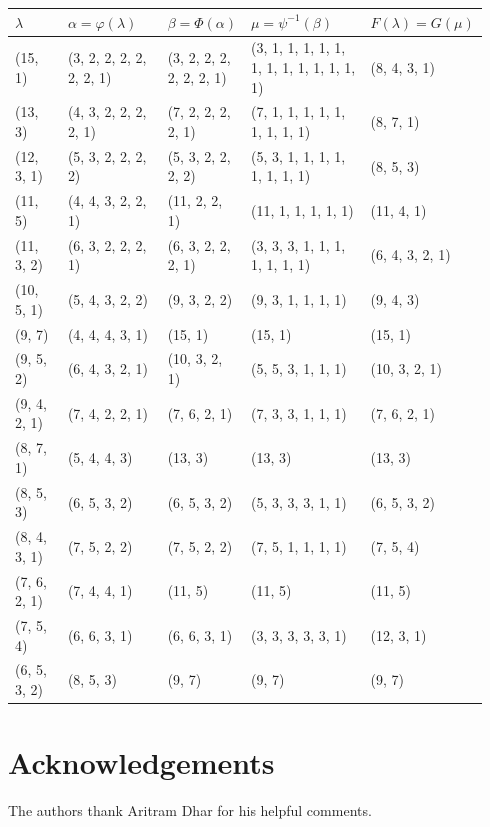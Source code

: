 \documentclass[11pt]{amsart}
\theoremstyle{definition}
\theoremstyle{remark}
\begin{document}
\setlength{\tabcolsep}{2pt}
{\footnotesize
\begin{longtable}{@{}>{\raggedright\arraybackslash}p{0.13\linewidth}>{\raggedright\arraybackslash}p{0.23\linewidth}>{\raggedright\arraybackslash}p{0.17\linewidth}>{\raggedright\arraybackslash}p{0.28\linewidth}>{\raggedright\arraybackslash}p{0.13\linewidth}@{}}
\toprule
\(\lambda\) & \(\alpha=\varphi(\lambda)\) & \(\beta=\Phi(\alpha)\) & \(\mu=\psi^{-1}(\beta)\) & \(F(\lambda)=G(\mu)\) \\
\midrule
\endhead
(15, 1) & (3, 2, 2, 2, 2, 2, 2, 1) & (3, 2, 2, 2, 2, 2, 2, 1) & (3, 1, 1, 1, 1, 1, 1, 1, 1, 1, 1, 1, 1, 1) & (8, 4, 3, 1) \\
(13, 3) & (4, 3, 2, 2, 2, 2, 1) & (7, 2, 2, 2, 2, 1) & (7, 1, 1, 1, 1, 1, 1, 1, 1, 1) & (8, 7, 1) \\
(12, 3, 1) & (5, 3, 2, 2, 2, 2) & (5, 3, 2, 2, 2, 2) & (5, 3, 1, 1, 1, 1, 1, 1, 1, 1) & (8, 5, 3) \\
(11, 5) & (4, 4, 3, 2, 2, 1) & (11, 2, 2, 1) & (11, 1, 1, 1, 1, 1) & (11, 4, 1) \\
(11, 3, 2) & (6, 3, 2, 2, 2, 1) & (6, 3, 2, 2, 2, 1) & (3, 3, 3, 1, 1, 1, 1, 1, 1, 1) & (6, 4, 3, 2, 1) \\
(10, 5, 1) & (5, 4, 3, 2, 2) & (9, 3, 2, 2) & (9, 3, 1, 1, 1, 1) & (9, 4, 3) \\
(9, 7) & (4, 4, 4, 3, 1) & (15, 1) & (15, 1) & (15, 1) \\
(9, 5, 2) & (6, 4, 3, 2, 1) & (10, 3, 2, 1) & (5, 5, 3, 1, 1, 1) & (10, 3, 2, 1) \\
(9, 4, 2, 1) & (7, 4, 2, 2, 1) & (7, 6, 2, 1) & (7, 3, 3, 1, 1, 1) & (7, 6, 2, 1) \\
(8, 7, 1) & (5, 4, 4, 3) & (13, 3) & (13, 3) & (13, 3) \\
(8, 5, 3) & (6, 5, 3, 2) & (6, 5, 3, 2) & (5, 3, 3, 3, 1, 1) & (6, 5, 3, 2) \\
(8, 4, 3, 1) & (7, 5, 2, 2) & (7, 5, 2, 2) & (7, 5, 1, 1, 1, 1) & (7, 5, 4) \\
(7, 6, 2, 1) & (7, 4, 4, 1) & (11, 5) & (11, 5) & (11, 5) \\
(7, 5, 4) & (6, 6, 3, 1) & (6, 6, 3, 1) & (3, 3, 3, 3, 3, 1) & (12, 3, 1) \\
(6, 5, 3, 2) & (8, 5, 3) & (9, 7) & (9, 7) & (9, 7) \\
\bottomrule
\end{longtable}
}

\section*{Acknowledgements}
The authors thank Aritram Dhar for his helpful comments.
\end{document}
